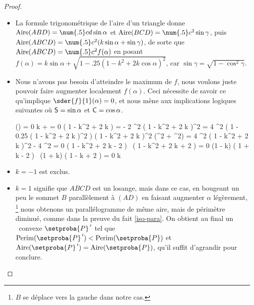 \begin{proof}
\begin{itemize}
	    \item La formule trigonométrique de l'aire d'un triangle donne
	    $\area{ABD} = \num{.5} c d \sin \alpha$
	    et
	    $\area{BCD} = \num{.5} c^2 \sin \gamma$,
	   	puis
	    $\area{ABCD} = \num{.5} c^2 ( k \sin \alpha + \sin \gamma )$,
	    de sorte que
    	$\area{ABCD} = \num{.5} c^2 f(\alpha)$
    	en posant 
    	$f(\alpha) = k \sin \alpha + \sqrt{1 - \num{.25} ( 1 - k^2 + 2 k \cos \alpha)^2}$,
	    car 
	    $\sin \gamma = \sqrt{1 - \cos^2 \gamma}$.


	    \item Nous n'avons pas besoin d'atteindre le maximum de $f$, nous voulons juste pouvoir faire augmenter localement $f(\alpha)$. 
	    Ceci nécessite de savoir ce qu'implique $\sder{f}{1}(\alpha) = 0$, et nous mène aux implications logiques suivantes où 
	    $\mathsf{S} = \sin \alpha$ et $\mathsf{C} = \cos \alpha$.
	    
	    \begin{stepcalc}[style=ar*, ope={\implies[d'où]}]
	        (\alpha) = 0
	    \explnext{}
	        k 
	        +
	        =
	        0
	    \explnext{}
	         ( 1 - k^2 + 2 k ) 
	        =
	        - 2  
	    \explnext{}
	        ^2 ( 1 - k^2 + 2 k )^2
	        =
	        4 ^2 \big( 1 - \num{.25} ( 1 - k^2 + 2 k )^2 \big)
	    \explnext{}
	        ( 1 - k^2 + 2 k )^2 (^2 + ^2)
	        =
	        4 ^2
	        ( 1 - k^2 + 2 k )^2 - 4 ^2 = 0
	    \explnext{}
	        ( 1 - k^2 + 2 k  - 2  )
	        \,
	        ( 1 - k^2 + 2 k  + 2  )
	        = 0
	    \explnext{}
	        (1 - k) ( 1 + k - 2  )
	        \,
	        (1 + k) ( 1 - k + 2  ) = 0
	    \explnext{}
	        k \in {}
	        \,\,  \,\,
	         \in {}
	    \end{stepcalc}


	    \item $k = -1$ est exclus.


	    \item $k = 1$ signifie que $ABCD$ est un losange, mais dans ce cas, en bougeant un peu le sommet $B$ parallèlement à $(AD)$ en faisant augmenter $\alpha$ légèrement,%
	    \footnote{
	        $B$ se déplace vers la gauche dans notre cas.
	    }
	    nous obtenons un parallélogramme de même aire, mais de périmètre diminué, comme dans la preuve du fait \ref{iso-para}.
	    On obtient au final un \ngone\ convexe $\primeit{\setproba{P}}$ tel que
		$\perim{\primeit{\setproba{P}}} < \perim{\setproba{P}}$
		et
		$\area{\primeit{\setproba{P}}} = \area{\setproba{P}}$,
		qu'il suffit d'agrandir pour conclure.



\end{itemize}
\end{proof}
